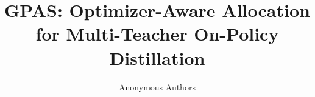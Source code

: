 \documentclass{article} %
\title{GPAS: Optimizer-Aware Allocation\\for Multi-Teacher On-Policy Distillation}
\author{Anonymous Authors}
\theoremstyle{remark}
\begin{document}
\maketitle













\appendix

\setcounter{table}{0}
\renewcommand{\thetable}{A\arabic{table}}


\end{document}
